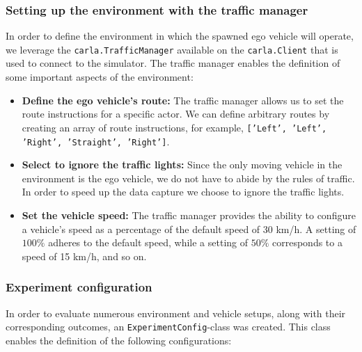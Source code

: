 \subsubsection{Setting up the environment with the traffic manager}

In order to define the environment in which the spawned ego vehicle will operate, we leverage the \texttt{carla.TrafficManager} available on the \texttt{carla.Client} that is used to connect to the simulator. The traffic manager enables the definition of some important aspects of the environment:

\begin{itemize}
    \item \textbf{Define the ego vehicle's route:} The traffic manager allows us to set the route instructions for a specific actor. We can define arbitrary routes by creating an array of route instructions, for example, \texttt{['Left', 'Left', 'Right', 'Straight', 'Right']}.
    \item \textbf{Select to ignore the traffic lights:} Since the only moving vehicle in the environment is the ego vehicle, we do not have to abide by the rules of traffic. In order to speed up the data capture we choose to ignore the traffic lights.
    \item \textbf{Set the vehicle speed:} The traffic manager provides the ability to configure a vehicle's speed as a percentage of the default speed of 30 km/h. A setting of $100\%$ adheres to the default speed, while a setting of $50\%$ corresponds to a speed of 15 km/h, and so on.
\end{itemize}


\subsubsection{Experiment configuration}
In order to evaluate numerous environment and vehicle setups, along with their corresponding outcomes, an \texttt{ExperimentConfig}-class was created. This class enables the definition of the following configurations:

